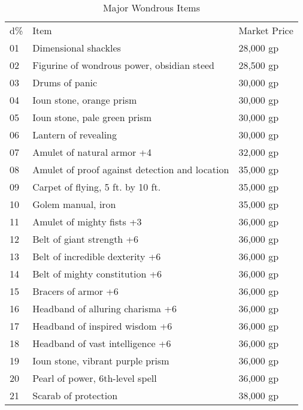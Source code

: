 \begin{table}[]
\sffamily
\caption{Major Wondrous Items}
\setlength{\tabcolsep}{1pt}
\begin{tabularx}{\linewidth}{lXl}
d\% & Item                                           & Market Price \\
01  & Dimensional shackles                           & 28,000 gp    \\
02  & Figurine of wondrous power, obsidian steed     & 28,500 gp    \\
03  & Drums of panic                                 & 30,000 gp    \\
04  & Ioun stone, orange prism                       & 30,000 gp    \\
05  & Ioun stone, pale green prism                   & 30,000 gp    \\
06  & Lantern of revealing                           & 30,000 gp    \\
07  & Amulet of natural armor +4                     & 32,000 gp    \\
08  & Amulet of proof against detection and location & 35,000 gp    \\
09  & Carpet of flying, 5 ft. by 10 ft.              & 35,000 gp    \\
10  & Golem manual, iron                             & 35,000 gp    \\
11  & Amulet of mighty fists +3                      & 36,000 gp    \\
12  & Belt of giant strength +6                      & 36,000 gp    \\
13  & Belt of incredible dexterity +6                & 36,000 gp    \\
14  & Belt of mighty constitution +6                 & 36,000 gp    \\
15  & Bracers of armor +6                            & 36,000 gp    \\
16  & Headband of alluring charisma +6               & 36,000 gp    \\
17  & Headband of inspired wisdom +6                 & 36,000 gp    \\
18  & Headband of vast intelligence +6               & 36,000 gp    \\
19  & Ioun stone, vibrant purple prism               & 36,000 gp    \\
20  & Pearl of power, 6th-level spell                & 36,000 gp    \\
21  & Scarab of protection                           & 38,000 gp    \\

\end{tabularx}
\end{table}
